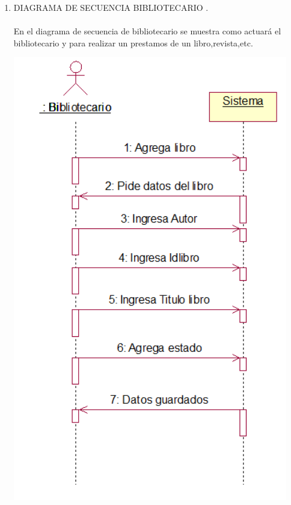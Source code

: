 \begin{enumerate}[1.]
\newpage
	\item DIAGRAMA DE SECUENCIA BIBLIOTECARIO .\\\\
	En el diagrama de secuencia de bibliotecario se muestra como actuará el bibliotecario y para realizar un prestamos de un libro,revista,etc.\\
    
	\begin{center}
	\includegraphics[width=12cm]{./Imagenes/img4} 
	\end{center}


\end{enumerate}
